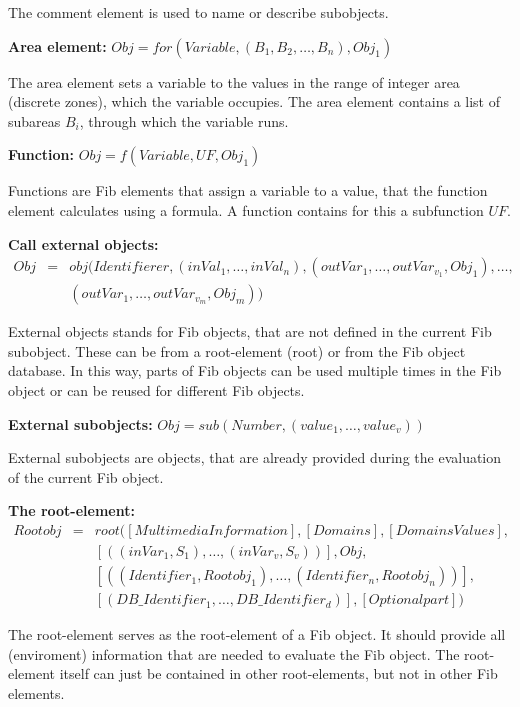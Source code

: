 \documentclass[10pt,a4paper]{article}
\begin{document}
The comment element is used to name or describe subobjects.


\bigskip\noindent
\textbf{Area element:} $Obj = for( Variable, ( B_{1}, B_{2},\ldots, B_{n}), Obj_1)$

The area element sets a variable to the values in the range of integer area (discrete zones), which the variable occupies. The area element contains a list of subareas $B_{i}$, through which the variable runs.


\bigskip\noindent
\textbf{Function:} $Obj = f( Variable ,UF ,Obj_1 )$

Functions are Fib elements that assign a variable to a value, that the function element calculates using a formula.
A function contains for this a subfunction $UF$.


\bigskip\noindent
\textbf{Call external objects:}
\begin{eqnarray*}
Obj &=& obj( Identifierer , ( inVal_1 , \ldots , inVal_n ) , ( outVar_{1}, \ldots ,outVar_{v_1}, Obj_1), \ldots , \\
  && ( outVar_{1}, \ldots ,outVar_{v_m}, Obj_m) )
\end{eqnarray*}

External objects stands for Fib objects, that are not defined in the current Fib subobject. These can be from a root-element (root) or from the Fib object database. In this way, parts of Fib objects can be used multiple times in the Fib object or can be reused for different Fib objects.


\bigskip\noindent
\textbf{External subobjects:} $Obj = sub( Number , ( value_1, \ldots , value_v ) )$

External subobjects are objects, that are already provided during the evaluation of the current Fib object.


\bigskip\noindent
\textbf{The root-element:}
\begin{eqnarray*}
Rootobj &=& root( [MultimediaInformation], [Domains], [DomainsValues], \\
&& [( (inVar_1, S_1), \ldots , (inVar_v, S_v) )], Obj , \\
&& [((Identifier_1, Rootobj_1) , \ldots , (Identifier_n, Rootobj_n))],\\
&& [( DB\_Identifier_1, \ldots , DB\_Identifier_d)], [Optionalpart] )
\end{eqnarray*}

The root-element serves as the root-element of a Fib object. It should provide all (enviroment) information that are needed to evaluate the Fib object. The root-element itself can just be contained in other root-elements, but not in other Fib elements.
\end{document}
